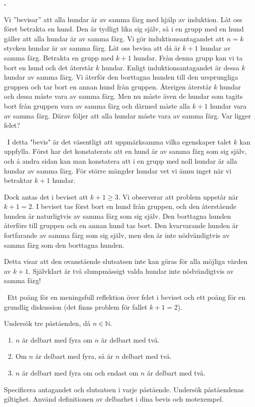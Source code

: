 \documentclass[11pt,a4paper,oneside,notitlepage,final]{article}
\newcommand{\N}{\mathbb{N}}
\newcounter{harjnro}
\newenvironment{harjlist}
  {\begin{list}{\kor{\arabic{harjnro}.}}
    {\usecounter{harjnro}
      \setlength{\labelwidth}{0em}
      \setlength{\labelsep}{0.4em}
      \setlength{\leftmargin}{0pt}
      \setlength{\parsep}{5pt}
      \setlength{\itemindent}{0.4em}
      \setlength{\topsep}{0.5\parskip}
      \setlength{\itemsep}{0.75\parskip}
    }
  }
  {\end{list}}
\newcommand{\kor}[1]{\textbf{#1}}
\begin{document}
\begin{harjlist}
\item[4.] Vi ''bevisar'' att
alla hundar är av samma färg med hjälp av induktion. Låt oss först betrakta en hund. Den
är tydligt lika sig själv, så i en grupp med en hund gäller att alla hundar är av samma färg.
Vi gör induktionsantagandet att $n = k$ stycken hundar är av samma färg. Låt oss bevisa att
då är $k+1$ hundar av samma färg. Betrakta en grupp med $k+1$ hundar. Från denna grupp
kan vi ta bort en hund och det återstår $k$ hundar. Enligt induktionsantagandet är dessa $k$
hundar av samma färg. Vi återför den borttagna hunden till den ursprungliga gruppen och
tar bort en annan hund från gruppen. Återigen återstår $k$ hundar och dessa måste vara av
samma färg. Men nu måste även de hundar som tagits bort från gruppen vara av samma
färg och därmed måste alla $k + 1$ hundar vara av samma färg. Därav följer att alla hundar
måste vara av samma färg. Var ligger felet?


\vspace{0.4cm}
\losning \
I detta "bevis" är det väsentligt att uppmärksamma vilka egenskaper talet $k$ kan uppfylla. Först har det konstaterats att en hund är av samma färg som sig själv, och å andra sidan kan man konstatera att i en grupp med noll hundar är alla hundar av samma färg. För större mängder hundar vet vi ännu inget när vi betraktar $k+1$ hundar. 

Dock antas det i beviset att $k + 1 \geq 3$. Vi observerar att problem uppstår när $k + 1 = 2$. I beviset tas först bort en hund från gruppen, och den återstående hunden är naturligtvis av samma färg som sig själv. Den borttagna hunden återförs till gruppen och en annan hund tas bort. Den kvarvarande hunden är fortfarande av samma färg som sig själv, men den är inte nödvändigtvis av samma färg som den borttagna hunden. 

Detta visar att den ovanstående slutsatsen inte kan göras för alla möjliga värden av $k + 1$. Självklart är två slumpmässigt valda hundar inte nödvändigtvis av samma färg!



\bedomning \
Ett poäng för en meningsfull reflektion över felet i beviset och ett poäng för en grundlig diskussion (det finns problem för fallet $k+1=2$).

\item[5.] 
Undersök tre påståenden, då $n\in \N$. 
\begin{enumerate}
\item[(1)]
$n$ är delbart med fyra om $n$ är delbart med två.
\item[(2)]
Om $n$ är delbart med fyra, så är $n$ delbart med två.
\item[(3)]
$n$ är delbart med fyra om och endast om $n$ är delbart med två.
\end{enumerate}
Specificera antagandet och slutsatsen i varje påstående. Undersök påståendenas giltighet.
Använd definitionen av delbarhet i dina bevis och motexempel.


\end{harjlist}
\end{document}
